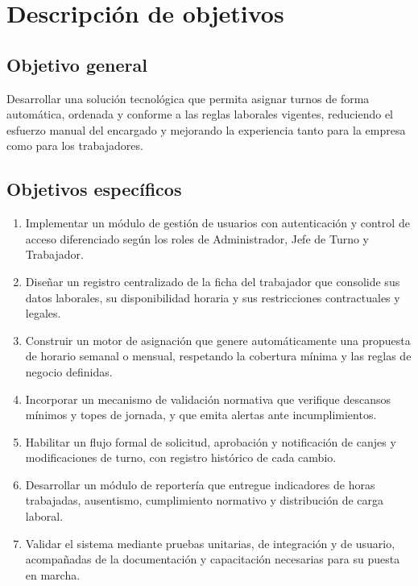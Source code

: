 \documentclass[12pt,letterpaper]{article}
\begin{document}
\section{Descripción de objetivos}

\subsection{Objetivo general}

Desarrollar una solución tecnológica que permita asignar turnos de forma automática, ordenada y conforme a las reglas laborales vigentes, reduciendo el esfuerzo manual del encargado y mejorando la experiencia tanto para la empresa como para los trabajadores.

\subsection{Objetivos específicos}

\begin{enumerate}[label=\textbf{OE-\arabic*.},leftmargin=2.6em,itemsep=0.25em]
  \item Implementar un módulo de gestión de usuarios con autenticación y control de acceso diferenciado según los roles de Administrador, Jefe de Turno y Trabajador.
  \item Diseñar un registro centralizado de la ficha del trabajador que consolide sus datos laborales, su disponibilidad horaria y sus restricciones contractuales y legales.
  \item Construir un motor de asignación que genere automáticamente una propuesta de horario semanal o mensual, respetando la cobertura mínima y las reglas de negocio definidas.
  \item Incorporar un mecanismo de validación normativa que verifique descansos mínimos y topes de jornada, y que emita alertas ante incumplimientos.
  \item Habilitar un flujo formal de solicitud, aprobación y notificación de canjes y modificaciones de turno, con registro histórico de cada cambio.
  \item Desarrollar un módulo de reportería que entregue indicadores de horas trabajadas, ausentismo, cumplimiento normativo y distribución de carga laboral.
  \item Validar el sistema mediante pruebas unitarias, de integración y de usuario, acompañadas de la documentación y capacitación necesarias para su puesta en marcha.
\end{enumerate}
\end{document}
